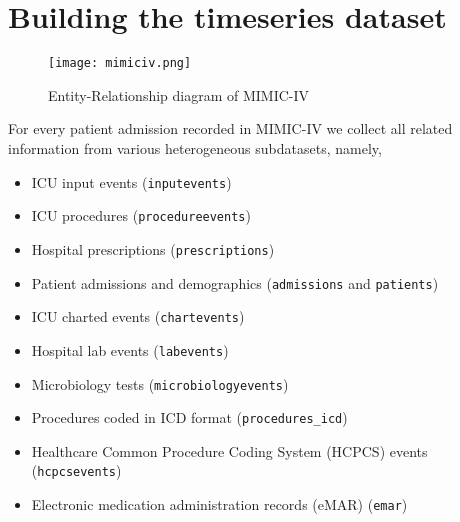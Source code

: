 
\newpage
\section{Building the timeseries dataset}

\begin{figure}
    \centering
    \texttt{[image: mimiciv.png]}
    \caption{Entity-Relationship diagram of MIMIC-IV}
    \label{fig:mimic}
\end{figure}

For every patient admission recorded in MIMIC-IV we collect all related information from various heterogeneous subdatasets, namely,

\begin{itemize}
    \item ICU input events (\texttt{inputevents})
    \item ICU procedures (\texttt{procedureevents})
    \item Hospital prescriptions (\texttt{prescriptions})
    \item Patient admissions and demographics (\texttt{admissions} and \texttt{patients})
    \item ICU charted events (\texttt{chartevents})
    \item Hospital lab events (\texttt{labevents})
    \item Microbiology tests (\texttt{microbiologyevents})
    \item Procedures coded in ICD format (\texttt{procedures\_icd})
    \item Healthcare Common Procedure Coding System (HCPCS) events (\texttt{hcpcsevents})
    \item Electronic medication administration records (eMAR) (\texttt{emar})
\end{itemize}

